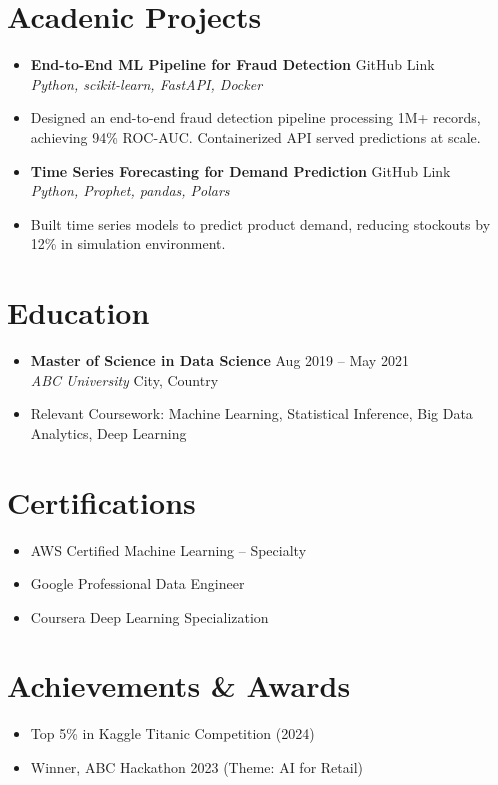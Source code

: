 \documentclass[a4paper,10pt]{article}
\newcommand{\resumeItem}[1]{\item\small{#1}}
\newcommand{\resumeSubheading}[4]{
  \vspace{1pt}\item
    \textbf{#1} \hfill {#2} \\
    \emph{#3} \hfill {#4} \\
}
\begin{document}
\section*{Acadenic Projects}
\begin{itemize}
    \resumeSubheading
      {End-to-End ML Pipeline for Fraud Detection}{GitHub Link}
      {Python, scikit-learn, FastAPI, Docker}{}
      \resumeItem{Designed an end-to-end fraud detection pipeline processing 1M+ records, achieving 94\% ROC-AUC. Containerized API served predictions at scale.}

    \resumeSubheading
      {Time Series Forecasting for Demand Prediction}{GitHub Link}
      {Python, Prophet, pandas, Polars}{}
      \resumeItem{Built time series models to predict product demand, reducing stockouts by 12\% in simulation environment.}
\end{itemize}

\section*{Education}
\begin{itemize}
  \resumeSubheading
    {Master of Science in Data Science}{Aug 2019 -- May 2021}
    {ABC University}{City, Country}
    \resumeItem{Relevant Coursework: Machine Learning, Statistical Inference, Big Data Analytics, Deep Learning}
\end{itemize}

\section*{Certifications}
\begin{itemize}
    \item AWS Certified Machine Learning – Specialty
    \item Google Professional Data Engineer
    \item Coursera Deep Learning Specialization
\end{itemize}

\section*{Achievements \& Awards}
\begin{itemize}
    \item Top 5\% in Kaggle Titanic Competition (2024)
    \item Winner, ABC Hackathon 2023 (Theme: AI for Retail)
\end{itemize}
\end{document}

